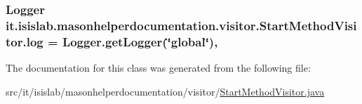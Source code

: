 \hypertarget{classit_1_1isislab_1_1masonhelperdocumentation_1_1visitor_1_1_start_method_visitor_a5148d3b6765bf49ed2c8c437c14d16e8}{
\subsubsection[{log}]{\setlength{\rightskip}{0pt plus 5cm}Logger it.\-isislab.\-masonhelperdocumentation.\-visitor.\-Start\-Method\-Visitor.\-log = Logger.\-get\-Logger(\char`\"{}global\char`\"{})\hspace{0.3cm}{\ttfamily [static]}, {\ttfamily [private]}}}\label{classit_1_1isislab_1_1masonhelperdocumentation_1_1visitor_1_1_start_method_visitor_a5148d3b6765bf49ed2c8c437c14d16e8}


The documentation for this class was generated from the following file\-:\begin{DoxyCompactItemize}
\item 
src/it/isislab/masonhelperdocumentation/visitor/\hyperlink{_start_method_visitor_8java}{Start\-Method\-Visitor.\-java}\end{DoxyCompactItemize}
